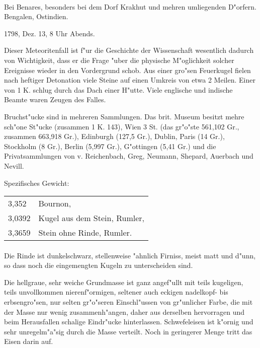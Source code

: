 \documentclass[a4paper, 11pt, oneside]{article}
\begin{document}
\paragraph{}
Bei Benares, besonders bei dem Dorf Krakhut und mehren umliegenden D"orfern. Bengalen, Ostindien.

1798, Dez. 13, 8 Uhr Abends.

Dieser Meteoritenfall ist f"ur die Geschichte der Wissenschaft wesentlich dadurch von Wichtigkeit, dass er die Frage "uber die physische M"oglichkeit solcher Ereignisse wieder in den Vordergrund schob. Aus einer gro"sen Feuerkugel fielen nach heftiger Detonation viele Steine auf einen Umkreis von etwa 2 Meilen. Einer von 1 K. schlug durch das Dach einer H"utte. Viele englische und indische Beamte waren Zeugen des Falles.

Bruchst"ucke sind in mehreren Sammlungen. Das brit. Museum besitzt mehre sch"one St"ucke (zusammen 1 K. 143), Wien 3 St. (das gr"o"ste 561,102 Gr., zusammen 663,918 Gr.), Edinburgh (127,5 Gr.), Dublin, Paris (14 Gr.), Stockholm (8 Gr.), Berlin (5,997 Gr.), G"ottingen (5,41 Gr.) und die Privatsammlungen von v. Reichenbach, Greg, Neumann, Shepard, Auerbach und Nevill.

Spezifisches Gewicht:
\begin{table}[!ht]
    \centering
    \begin{tabular}{l l}
        3,352 & Bournon,\\
        3,0392 & Kugel aus dem Stein, Rumler,\\
        3,3659 & Stein ohne Rinde, Rumler.
    \end{tabular}
\end{table}
\paragraph{}
Die Rinde ist dunkelschwarz, stellenweise "ahnlich Firniss, meist matt und d"unn, so dass noch die eingemengten Kugeln zu unterscheiden sind.

Die hellgraue, sehr weiche Grundmasse ist ganz angef"ullt mit teils kugeligen, teils unvollkommen nierenf"ormigen, seltener auch eckigen nadelkopf- bis erbsengro"sen, nur selten gr"o"seren Einschl"ussen von gr"unlicher Farbe, die mit der Masse nur wenig zusammenh"angen, daher aus derselben hervorragen und beim Herausfallen schalige Eindr"ucke hinterlassen. Schwefeleisen ist k"ornig und sehr unregelm"a"sig durch die Masse verteilt. Noch in geringerer Menge tritt das Eisen darin auf.
\end{document}
